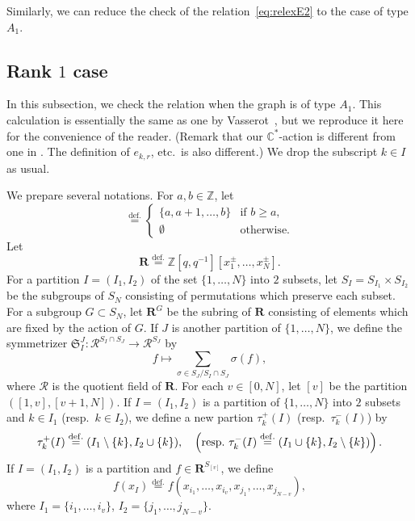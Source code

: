 \documentclass[12pt]{amsart}
\def\Bbb{\mathbb}
\theoremstyle{definition}
\theoremstyle{remark}
\numberwithin{equation}{subsection}
\newcommand{\defeq}{\overset{\operatorname{\scriptstyle def.}}{=}}
\newcommand{\C}{{\Bbb C}}
\newcommand{\Z}{{\Bbb Z}}
\begin{document}
Similarly, we can reduce the check of the relation~\eqref{eq:relexE2}
to the case of type $A_1$.

\subsection{Rank $1$ case}\label{subsec:rank1}
In this subsection, we check the relation when the graph is of type
$A_1$. This calculation is essentially the same as one by
Vasserot~\cite{Vasserot}, but we reproduce it here for the convenience
of the reader. (Remark that our $\C^*$-action is different from one
in \cite{Vasserot}. The definition of $e_{k,r}$, etc.\ is also
different.) We drop the subscript $k\in I$ as usual.

We prepare several notations.
For $a,b\in\Z$, let
\begin{equation*}
   [a,b] \defeq 
\begin{cases}
  \{ a, a+1, \dots, b \} & \text{if $b \ge a$}, \\
  \emptyset & \text{otherwise}.
\end{cases}
\end{equation*}
Let
\begin{equation*}
  \mathbf R \defeq 
\Z[q,q^{-1}][x_1^{\pm},\dots, x_{N}^\pm].
\end{equation*}
%
For a partition $I = (I_1, I_2)$ of the set $\{1, \dots, N\}$ into $2$
subsets, let $S_I = S_{I_1} \times S_{I_2}$ be the subgroups of $S_N$
consisting of permutations which preserve each subset.
%
For a subgroup $G\subset S_N$, let $\mathbf R^{G}$ be the subring of
$\mathbf R$ consisting of elements which are fixed by the action of $G$.
%
If $J$ is another partition of $\{1,\dots,N\}$, we define the 
symmetrizer ${\mathfrak S}_I^J\colon
{\mathcal R}^{S_I\cap S_J}\to {\mathcal R}^{S_J}$ by
\begin{equation*}
   f \mapsto \sum_{\sigma\in S_J/S_I\cap S_J} \sigma(f),
\end{equation*}
where $\mathcal R$ is the quotient field of $\mathbf R$.
%
For each $v\in [0, N]$, let $[v]$ be the partition
\(
   ([1, v], [v+1,N])
\).
%
If $I = (I_1, I_2)$ is a partition of $\{1,\dots, N\}$ into $2$
subsets and $k\in I_1$ (resp.\ $k\in I_2$), we define a new partion
$\tau_k^+(I)$ (resp.\ $\tau_k^-(I)$) by
\begin{equation*}
   \tau_k^+(I) \defeq (I_1\setminus \{k\}, I_2\cup \{ k\}), \quad
   \left(\text{resp.\
   $\tau_k^-(I)\defeq (I_1\cup \{ k\}, I_2\setminus \{k\})$}\right).
\end{equation*}
If $I = (I_1, I_2)$ is a partition and $f\in \mathbf R^{S_{[v]}}$, we
define
\begin{equation*}
   f(x_I) \defeq f(x_{i_1}, \dots, x_{i_v},
   x_{j_1}, \dots, x_{j_{N-v}}),
\end{equation*}
where $I_1 = \{ i_1, \dots, i_v \}$, $I_2 = \{ j_1, \dots, j_{N-v} \}$.
\end{document}

